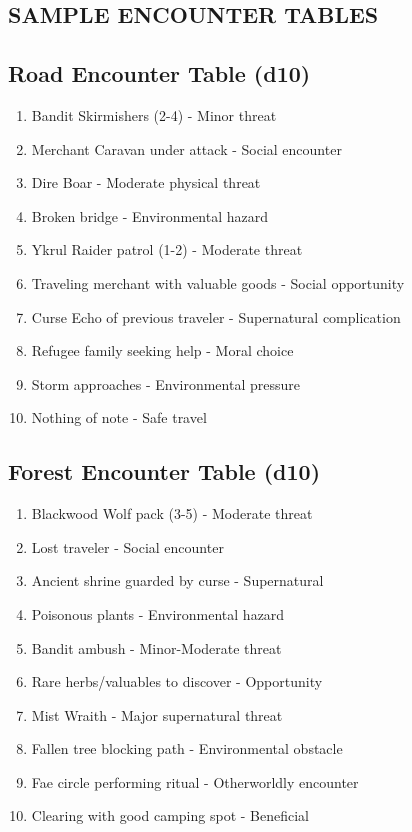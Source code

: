 \documentclass[12pt]{article}
\begin{document}
\begin{itemize}
\section{SAMPLE ENCOUNTER TABLES}

\subsection*{Road Encounter Table (d10)}
\begin{enumerate}
\item Bandit Skirmishers (2-4) - Minor threat
\item Merchant Caravan under attack - Social encounter
\item Dire Boar - Moderate physical threat
\item Broken bridge - Environmental hazard
\item Ykrul Raider patrol (1-2) - Moderate threat
\item Traveling merchant with valuable goods - Social opportunity
\item Curse Echo of previous traveler - Supernatural complication
\item Refugee family seeking help - Moral choice
\item Storm approaches - Environmental pressure
\item Nothing of note - Safe travel
\end{enumerate}

\subsection*{Forest Encounter Table (d10)}
\begin{enumerate}
\item Blackwood Wolf pack (3-5) - Moderate threat
\item Lost traveler - Social encounter
\item Ancient shrine guarded by curse - Supernatural
\item Poisonous plants - Environmental hazard
\item Bandit ambush - Minor-Moderate threat
\item Rare herbs/valuables to discover - Opportunity
\item Mist Wraith - Major supernatural threat
\item Fallen tree blocking path - Environmental obstacle
\item Fae circle performing ritual - Otherworldly encounter
\item Clearing with good camping spot - Beneficial
\end{enumerate}


\end{itemize}
\end{document}
